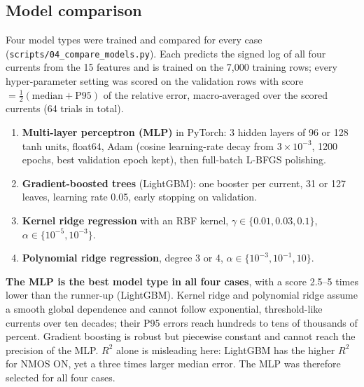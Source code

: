 \subsection{Model comparison}\label{sec:comparison}
Four model types were trained and compared for every case (\texttt{scripts/04\_compare\_models.py}). Each predicts the signed log of all four
currents from the 15 features and is trained on the 7{,}000 training rows; every hyper-parameter setting was scored on the validation rows with
score $=\frac12(\text{median}+\text{P95})$ of the relative error, macro-averaged over the scored currents (64 trials in total).
\begin{enumerate}
  \item \textbf{Multi-layer perceptron (MLP)} in PyTorch: 3 hidden layers of 96 or 128 tanh units, float64, Adam (cosine learning-rate decay from
        $3\times10^{-3}$, 1200 epochs, best validation epoch kept), then full-batch L-BFGS polishing.
  \item \textbf{Gradient-boosted trees} (LightGBM): one booster per current, 31 or 127 leaves, learning rate 0.05, early stopping on validation.
  \item \textbf{Kernel ridge regression} with an RBF kernel, $\gamma\in\{0.01,0.03,0.1\}$, $\alpha\in\{10^{-5},10^{-3}\}$.
  \item \textbf{Polynomial ridge regression}, degree 3 or 4, $\alpha\in\{10^{-3},10^{-1},10\}$.
\end{enumerate}


\textbf{The MLP is the best model type in all four cases}, with a score 2.5--5 times lower than the runner-up (LightGBM). Kernel ridge and polynomial
ridge assume a smooth global dependence and cannot follow exponential, threshold-like currents over ten decades; their P95 errors reach hundreds to
tens of thousands of percent. Gradient boosting is robust but piecewise constant and cannot reach the precision of the MLP. $R^2$ alone is misleading
here: LightGBM has the higher $R^2$ for NMOS ON, yet a three times larger median error. The MLP was therefore selected for all four cases.

